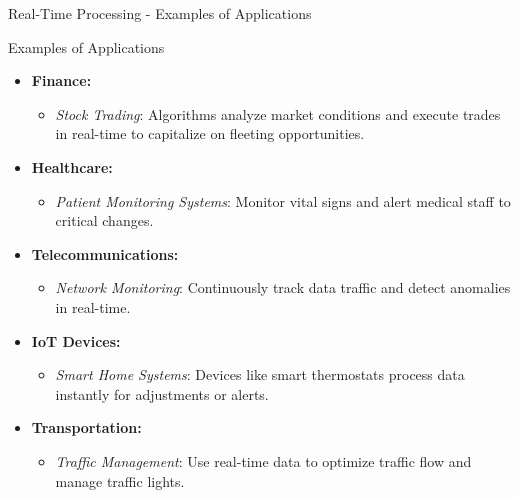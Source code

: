 \documentclass[aspectratio=169]{beamer}
\begin{document}
\begin{frame}[fragile]{Real-Time Processing - Examples of Applications}
    \begin{block}{Examples of Applications}
        \begin{itemize}
            \item \textbf{Finance:}
                \begin{itemize}
                    \item \textit{Stock Trading}: Algorithms analyze market conditions and execute trades in real-time to capitalize on fleeting opportunities.
                \end{itemize}
                
            \item \textbf{Healthcare:}
                \begin{itemize}
                    \item \textit{Patient Monitoring Systems}: Monitor vital signs and alert medical staff to critical changes.
                \end{itemize}
                
            \item \textbf{Telecommunications:}
                \begin{itemize}
                    \item \textit{Network Monitoring}: Continuously track data traffic and detect anomalies in real-time.
                \end{itemize}
                
            \item \textbf{IoT Devices:}
                \begin{itemize}
                    \item \textit{Smart Home Systems}: Devices like smart thermostats process data instantly for adjustments or alerts.
                \end{itemize}
                
            \item \textbf{Transportation:}
                \begin{itemize}
                    \item \textit{Traffic Management}: Use real-time data to optimize traffic flow and manage traffic lights.
                \end{itemize}
        \end{itemize}
    \end{block}
\end{frame}
\end{document}
